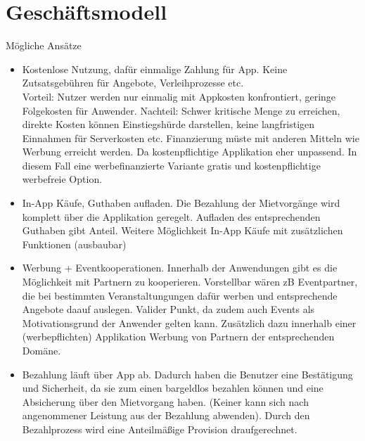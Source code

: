
\section{Geschäftsmodell}
Mögliche Ansätze
\begin{itemize}
   \item Kostenlose Nutzung, dafür einmalige Zahlung für App. Keine Zutsatsgebühren für Angebote, Verleihprozesse etc.\\
   Vorteil: Nutzer werden nur einmalig mit Appkosten konfrontiert, geringe Folgekosten für Anwender.
   Nachteil: Schwer kritische Menge zu erreichen, direkte Kosten können Einstiegshürde darstellen, keine langfristigen Einnahmen für Serverkosten etc. Finanzierung müste mit anderen Mitteln wie Werbung erreicht werden. Da kostenpflichtige Applikation eher unpassend. In diesem Fall eine werbefinanzierte Variante gratis und kostenpflichtige werbefreie Option.

   \item In-App Käufe, Guthaben aufladen. Die Bezahlung der Mietvorgänge wird komplett über die Applikation geregelt. Aufladen des entsprechenden Guthaben gibt Anteil. Weitere Möglichkeit In-App Käufe mit zusätzlichen Funktionen (ausbaubar)

   \item Werbung + Eventkooperationen.
   Innerhalb der Anwendungen gibt es die Möglichkeit mit Partnern zu kooperieren. Vorstellbar wären zB Eventpartner, die bei bestimmten Veranstaltungungen dafür werben und entsprechende Angebote daauf auslegen. Valider Punkt, da zudem auch Events als Motivationsgrund der Anwender gelten kann. Zusätzlich dazu innerhalb einer (werbepflichten) Applikation Werbung von Partnern der entsprechenden Domäne.

   \item Bezahlung läuft über App ab. Dadurch haben die Benutzer eine Bestätigung und Sicherheit, da sie zum einen bargeldlos bezahlen können und eine Absicherung über den Mietvorgang haben. (Keiner kann sich nach angenommener Leistung aus der Bezahlung abwenden). Durch den Bezahlprozess wird eine Anteilmäßige Provision draufgerechnet. 


\end{itemize}
 